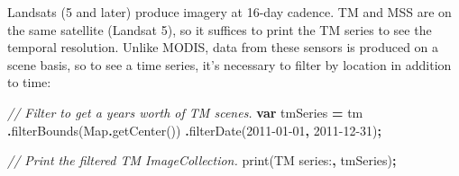 \documentclass[
]{article}
\newenvironment{Shaded}{\begin{snugshade}}{\end{snugshade}}
\newcommand{\BuiltInTok}[1]{#1}
\newcommand{\CommentTok}[1]{\textcolor[rgb]{0.56,0.35,0.01}{\textit{#1}}}
\newcommand{\FunctionTok}[1]{\textcolor[rgb]{0.00,0.00,0.00}{#1}}
\newcommand{\KeywordTok}[1]{\textcolor[rgb]{0.13,0.29,0.53}{\textbf{#1}}}
\newcommand{\NormalTok}[1]{#1}
\newcommand{\OperatorTok}[1]{\textcolor[rgb]{0.81,0.36,0.00}{\textbf{#1}}}
\newcommand{\StringTok}[1]{\textcolor[rgb]{0.31,0.60,0.02}{#1}}
\begin{document}
Landsats (5 and later) produce imagery at 16-day cadence. TM and MSS are on the same satellite (Landsat 5), so it suffices to print the TM series to see the temporal resolution. Unlike MODIS, data from these sensors is produced on a scene basis, so to see a time series, it's necessary to filter by location in addition to time:

\begin{Shaded}
\begin{Highlighting}[]

   \CommentTok{// Filter to get a year\textquotesingle{}s worth of TM scenes.}
  \KeywordTok{var}\NormalTok{ tmSeries }\OperatorTok{=}\NormalTok{ tm}
  \OperatorTok{.}\FunctionTok{filterBounds}\NormalTok{(}\BuiltInTok{Map}\OperatorTok{.}\FunctionTok{getCenter}\NormalTok{())}
  \OperatorTok{.}\FunctionTok{filterDate}\NormalTok{(}\StringTok{\textquotesingle{}2011{-}01{-}01\textquotesingle{}}\OperatorTok{,} \StringTok{\textquotesingle{}2011{-}12{-}31\textquotesingle{}}\NormalTok{)}\OperatorTok{;}
  
  \CommentTok{// Print the filtered TM ImageCollection. }
  \FunctionTok{print}\NormalTok{(}\StringTok{\textquotesingle{}TM series:\textquotesingle{}}\OperatorTok{,}\NormalTok{ tmSeries)}\OperatorTok{;}
  
\end{Highlighting}
\end{Shaded}
\end{document}
